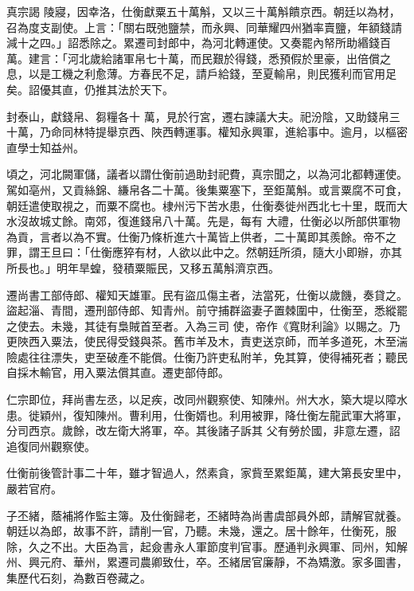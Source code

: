\begin{pinyinscope}
 真宗謁
 陵寢，因幸洛，仕衡獻粟五十萬斛，又以三十萬斛饋京西。朝廷以為材，召為度支副使。上言：「關右既弛鹽禁，而永興、同華耀四州猶率賣鹽，年額錢請減十之四。」詔悉除之。累遷司封郎中，為河北轉運使。又奏罷內帑所助緡錢百萬。建言：「河北歲給諸軍帛七十萬，而民艱於得錢，悉預假於里豪，出倍償之息，以是工機之利愈薄。方春民不足，請戶給錢，至夏輸帛，則民獲利而官用足矣。詔優其直，仍推其法於天下。



 封泰山，獻錢帛、芻糧各十
 萬，見於行宮，遷右諫議大夫。祀汾陰，又助錢帛三十萬，乃命同林特提舉京西、陜西轉運事。權知永興軍，進給事中。逾月，以樞密直學士知益州。



 頃之，河北闕軍儲，議者以謂仕衡前過助封祀費，真宗聞之，以為河北都轉運使。駕如亳州，又貢絲錦、縑帛各二十萬。後集粟塞下，至鉅萬斛。或言粟腐不可食，朝廷遣使取視之，而粟不腐也。棣州污下苦水患，仕衡奏徙州西北七十里，既而大水沒故城丈餘。南郊，復進錢帛八十萬。先是，每有
 大禮，仕衡必以所部供軍物為貢，言者以為不實。仕衡乃條析進六十萬皆上供者，二十萬即其羨餘。帝不之罪，謂王旦曰：「仕衡應猝有材，人欲以此中之。然朝廷所須，隨大小即辦，亦其所長也。」明年旱蝗，發積粟賑民，又移五萬斛濟京西。



 遷尚書工部侍郎、權知天雄軍。民有盜瓜傷主者，法當死，仕衡以歲饑，奏貸之。盜起淄、青間，遷刑部侍郎、知青州。前守捕群盜妻子置棘圍中，仕衡至，悉縱罷之使去。未幾，其徒有梟賊首至者。入為三司
 使，帝作《寬財利論》以賜之。乃更陜西入粟法，使民得受錢與茶。舊市羊及木，責吏送京師，而羊多道死，木至湍險處往往漂失，吏至破產不能償。仕衡乃許吏私附羊，免其算，使得補死者；聽民自採木輸官，用入粟法償其直。遷吏部侍郎。



 仁宗即位，拜尚書左丞，以足疾，改同州觀察使、知陳州。州大水，築大堤以障水患。徙穎州，復知陳州。曹利用，仕衡婿也。利用被罪，降仕衡左龍武軍大將軍，分司西京。歲餘，改左衛大將軍，卒。其後諸子訴其
 父有勞於國，非意左遷，詔追復同州觀察使。



 仕衡前後管計事二十年，雖才智過人，然素貪，家貲至累鉅萬，建大第長安里中，嚴若官府。



 子丕緒，蔭補將作監主簿。及仕衡歸老，丕緒時為尚書虞部員外郎，請解官就養。朝廷以為郎，故事不許，請削一官，乃聽。未幾，還之。居十餘年，仕衡死，服除，久之不出。大臣為言，起僉書永人軍節度判官事。歷通判永興軍、同州，知解州、興元府、華州，累遷司農卿致仕，卒。丕緒居官廉靜，不為矯激。家多圖書，
 集歷代石刻，為數百卷藏之。




\end{pinyinscope}
